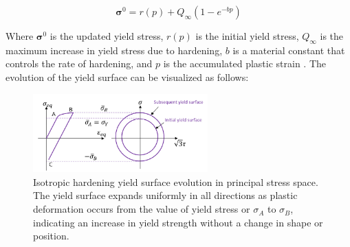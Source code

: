 \documentclass[12pt]{article}
\begin{document}
\begin{equation}
    \boldsymbol{\sigma}^0 = r(p) + Q_\infty(1 - e^{-bp})
\end{equation}

Where $\boldsymbol{\sigma}^0$ is the updated yield stress, $r(p)$ is the initial yield stress, 
$Q_\infty$ is the maximum increase in yield stress due to hardening, $b$ is a material constant that controls the rate of hardening, 
and $p$ is the accumulated plastic strain \cite{mehani2024modified}. The evolution of the yield surface can be visualized as follows:
\begin{figure}[H]
    \centering
    \includegraphics[width=0.6\textwidth]{images/Isotropic_Hardening.png}
    \caption{Isotropic hardening yield surface evolution in principal stress space. 
    The yield surface expands uniformly in all directions as plastic deformation occurs from the 
    value of yield stress or $\sigma_{A}$ to
    $\sigma_{B}$, 
    indicating an increase in yield strength without a change in shape or position. \cite{jahed2021cyclic}}
    \label{fig:isotropic_hardening}
\end{figure}
\end{document}
